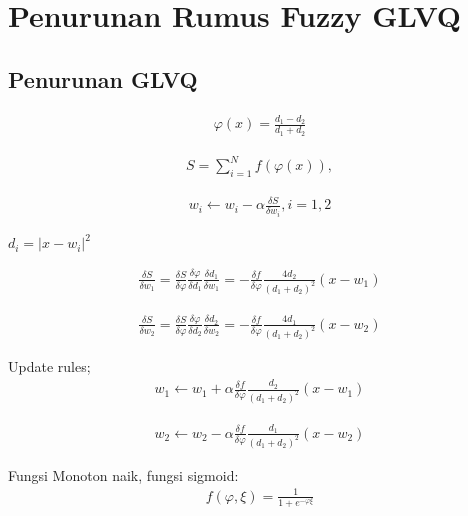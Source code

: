 \section{Penurunan Rumus Fuzzy GLVQ}

\subsection{Penurunan GLVQ}
\begin{align}
\label{eq:}
	\varphi(x) = \frac{d_1 - d_2}{d_1 + d_2}
\end{align}

\begin{align}
\label{eq:}
	S = \sum_{i=1}^{N} f(\varphi(x)), 
\end{align}

\begin{align}
\label{eq:}
	w_i \leftarrow w_i - \alpha \frac{\delta S}{\delta w_i}, i = 1, 2
\end{align}

$d_i = \lvert x - w_i\rvert ^2$

\begin{align}
\label{eq:}
	\frac{\delta S}{\delta w_1} =  
	\frac{\delta S}{\delta \varphi} \frac{\delta \varphi}{\delta d_1} \frac{\delta
	d_1}{\delta w_1} =
	- \frac{\delta f}{\delta \varphi} \frac{4d_2}{(d_1 + d_2)^2} (x - w_1)
\end{align}

\begin{align}
\label{eq:}
	\frac{\delta S}{\delta w_2} =  
	\frac{\delta S}{\delta \varphi} \frac{\delta \varphi}{\delta d_2} \frac{\delta
	d_2}{\delta w_2} =
	- \frac{\delta f}{\delta \varphi} \frac{4d_1}{(d_1 + d_2)^2} (x - w_2)
\end{align}

Update rules;
\begin{align}
\label{eq:}
	w_1 \leftarrow w_1 + \alpha   
	\frac{\delta f}{\delta \varphi} \frac{d_2}{(d_1 + d_2)^2} (x - w_1)
\end{align}

\begin{align}
\label{eq:}
	w_2 \leftarrow w_2 - \alpha   
	\frac{\delta f}{\delta \varphi} \frac{d_1}{(d_1 + d_2)^2} (x - w_2)
\end{align}

Fungsi Monoton naik, fungsi sigmoid:
\begin{align}
\label{eq:}
	f(\varphi, \xi) = \frac{1}{1 + e^{-\varphi \xi}}
\end{align}

